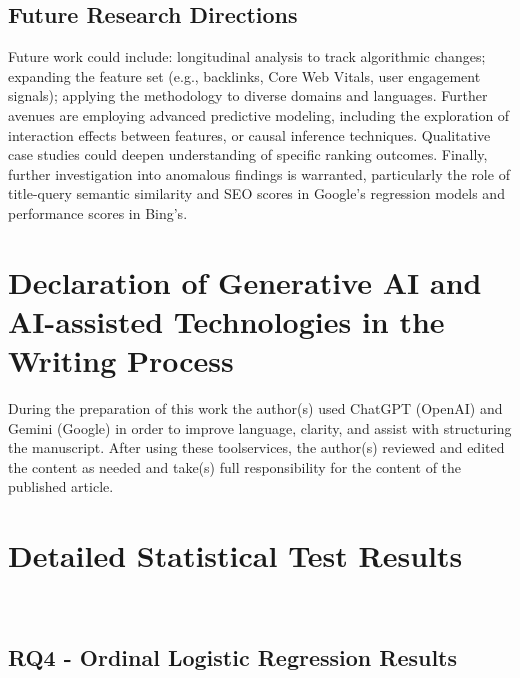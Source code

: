 \documentclass[a4paper,fleqn]{cas-sc}
\begin{document}
\subsection{Future Research Directions}
\label{subsec:conclusion_future}
Future work could include: longitudinal analysis to track algorithmic changes; expanding the feature set (e.g., backlinks, Core Web Vitals, user engagement signals); applying the methodology to diverse domains and languages. Further avenues are employing advanced predictive modeling, including the exploration of interaction effects between features, or causal inference techniques. Qualitative case studies could deepen understanding of specific ranking outcomes. Finally, further investigation into anomalous findings is warranted, particularly the role of title-query semantic similarity and SEO scores in Google's regression models and performance scores in Bing's.

\section*{Declaration of Generative AI and AI-assisted Technologies in the Writing Process}
During the preparation of this work the author(s) used ChatGPT (OpenAI) and Gemini (Google) in order to improve language, clarity, and assist with structuring the manuscript. After using these tool\/services, the author(s) reviewed and edited the content as needed and take(s) full responsibility for the content of the published article.

\clearpage
\appendix
\section{Detailed Statistical Test Results}
\label{app:detailed_stats} 
\subsection{RQ4 - Ordinal Logistic Regression Results}
\label{app:rq4_regression_tables}
\end{document}
